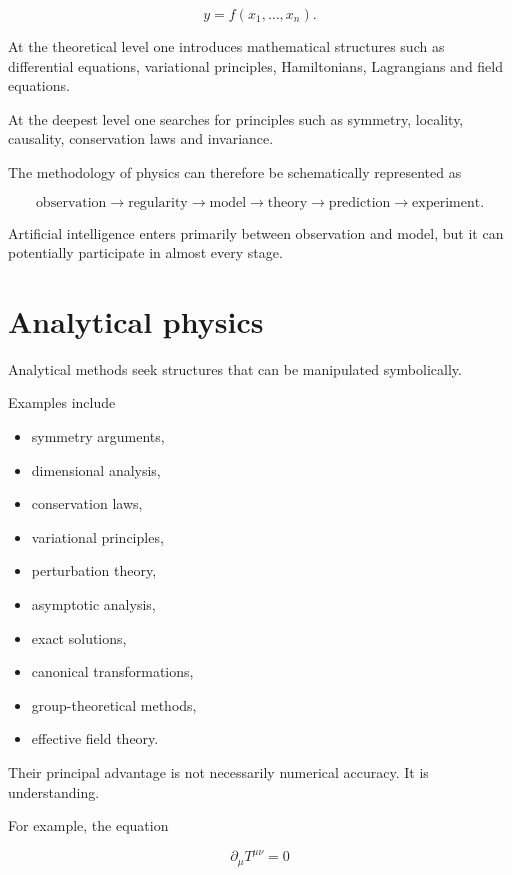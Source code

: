 \documentclass[11pt,a4paper,oneside]{book}
\begin{document}
\begin{equation}
y=f(x_1,\ldots,x_n).
\end{equation}

At the theoretical level one introduces mathematical structures such as
differential equations, variational principles, Hamiltonians, Lagrangians and
field equations.

At the deepest level one searches for principles such as symmetry, locality,
causality, conservation laws and invariance.

The methodology of physics can therefore be schematically represented as

\begin{equation}
\text{observation}
\longrightarrow
\text{regularity}
\longrightarrow
\text{model}
\longrightarrow
\text{theory}
\longrightarrow
\text{prediction}
\longrightarrow
\text{experiment}.
\end{equation}

Artificial intelligence enters primarily between observation and model, but it
can potentially participate in almost every stage.

\section{Analytical physics}

Analytical methods seek structures that can be manipulated symbolically.

Examples include

\begin{itemize}
\item symmetry arguments,
\item dimensional analysis,
\item conservation laws,
\item variational principles,
\item perturbation theory,
\item asymptotic analysis,
\item exact solutions,
\item canonical transformations,
\item group-theoretical methods,
\item effective field theory.
\end{itemize}

Their principal advantage is not necessarily numerical accuracy. It is
understanding.

For example, the equation

\begin{equation}
\partial_\mu T^{\mu\nu}=0
\end{equation}
\end{document}
